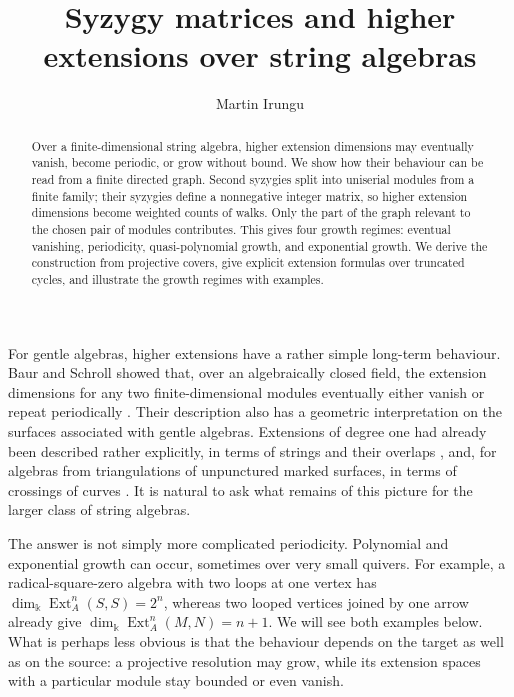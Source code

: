 \documentclass[reqno]{amsart}
\title[Syzygy matrices and higher extensions]{Syzygy matrices and higher extensions over string algebras}
\author{Martin Irungu}
\date{}
\makeatletter
\def\section{\@startsection{section}{3}\z@{.8\linespacing\@plus.7\linespacing}{1\linespacing}{\normalfont\Large\bfseries \centering}}
\numberwithin{equation}{section}
\theoremstyle{definition}
\theoremstyle{remark}
\DeclareMathOperator{\Ext}{Ext}
\newcommand{\kk}{\Bbbk}
\makeatother
\begin{document}
\begin{abstract}
Over a finite-dimensional string algebra, higher extension dimensions may eventually vanish, become periodic, or grow without bound. We show how their behaviour can be read from a finite directed graph. Second syzygies split into uniserial modules from a finite family; their syzygies define a nonnegative integer matrix, so higher extension dimensions become weighted counts of walks. Only the part of the graph relevant to the chosen pair of modules contributes. This gives four growth regimes: eventual vanishing, periodicity, quasi-polynomial growth, and exponential growth. We derive the construction from projective covers, give explicit extension formulas over truncated cycles, and illustrate the growth regimes with examples.
\end{abstract}
\maketitle

\tableofcontents

\section{Introduction}

For gentle algebras, higher extensions have a rather simple long-term behaviour. Baur and Schroll showed that, over an algebraically closed field, the extension dimensions for any two finite-dimensional modules eventually either vanish or repeat periodically \cite{BaurSchroll}. Their description also has a geometric interpretation on the surfaces associated with gentle algebras. Extensions of degree one had already been described rather explicitly, in terms of strings and their overlaps \cite{CPS}, and, for algebras from triangulations of unpunctured marked surfaces, in terms of crossings of curves \cite{CanakciSchroll17}. It is natural to ask what remains of this picture for the larger class of string algebras.

The answer is not simply more complicated periodicity. Polynomial and exponential growth can occur, sometimes over very small quivers. For example, a radical-square-zero algebra with two loops at one vertex has \(\dim_{\kk}\Ext_A^n(S,S)=2^n\), whereas two looped vertices joined by one arrow already give \(\dim_{\kk}\Ext_A^n(M,N)=n+1\). We will see both examples below. What is perhaps less obvious is that the behaviour depends on the target as well as on the source: a projective resolution may grow, while its extension spaces with a particular module stay bounded or even vanish.
\end{document}
